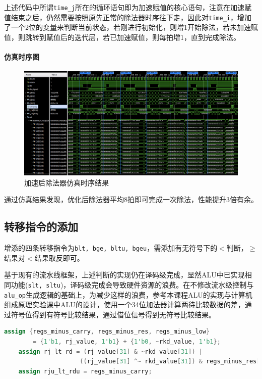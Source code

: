 \documentclass[UTF-8,twoside,c5size]{ctexart}
\begin{document}
	上述代码中所谓\texttt{time\_j}所在的循环语句即为加速赋值的核心语句，注意在加速赋值结束之后，仍然需要按照原先正常的除法器时序往下走，因此对\texttt{time\_i}，增加了一个2位的变量来判断当前状态，若刚进行初始化，则增1开始除法，若未加速赋值，则跳转到赋值后的迭代层，若已加速赋值，则每拍增1，直到完成除法。
	
	\paragraph{仿真时序图}\hfill
	
	\begin{figure}[h]
		\centering
		\includegraphics[width=1\linewidth]{figures/div_acc.png}
		\caption{加速后除法器仿真时序结果}
		\label{fig:divacc}
	\end{figure}

	通过仿真结果发现，优化后除法器平均8拍即可完成一次除法，性能提升3倍有余。
	
	
	\subsection{转移指令的添加}
	增添的四条转移指令为\texttt{blt, bge, bltu, bgeu}，需添加有无符号下的$ < $判断，$ \geqslant $结果对$ < $结果取反即可。
	
	基于现有的流水线框架，上述判断的实现仍在译码级完成，显然ALU中已实现相同功能(\texttt{slt, sltu})，译码级完成会导致硬件资源的浪费。在不修改流水级控制与\texttt{alu\_op}生成逻辑的基础上，为减少这样的浪费，参考本课程ALU的实现与计算机组成原理实验课中ALU的设计，使用一个34位加法器计算两待比较数据的差，通过符号位得到有符号比较结果，通过借位信号得到无符号比较结果。
	
	\begin{lstlisting}[language=verilog]
	assign {regs_minus_carry, regs_minus_res, regs_minus_low}
		= {1'b1, rj_value, 1'b1} + {1'b0, ~rkd_value, 1'b1};
	assign rj_lt_rd = (rj_value[31] & ~rkd_value[31]) |
					 ((rj_value[31] ^~ rkd_value[31]) & regs_minus_res[31]);
	assign rju_lt_rdu = regs_minus_carry;
	\end{lstlisting}
\end{document}
